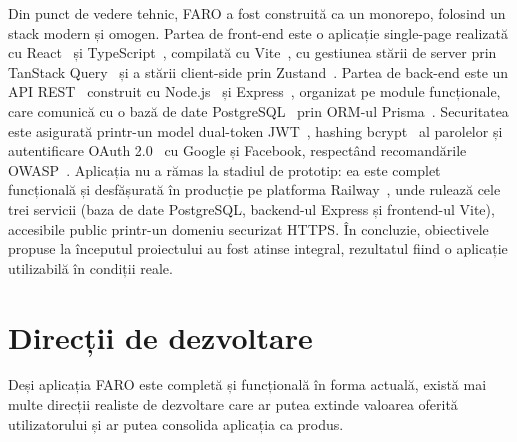 \documentclass[12pt,a4paper,oneside]{report}
\begin{document}
Din punct de vedere tehnic, FARO a fost construită ca un monorepo, folosind un stack modern și omogen. Partea de front-end este o aplicație single-page realizată cu React~\cite{ref:react} și TypeScript~\cite{ref:typescript}, compilată cu Vite~\cite{ref:vite}, cu gestiunea stării de server prin TanStack Query~\cite{ref:tanstack} și a stării client-side prin Zustand~\cite{ref:zustand}. Partea de back-end este un API REST~\cite{ref:rest} construit cu Node.js~\cite{ref:nodejs} și Express~\cite{ref:express}, organizat pe module funcționale, care comunică cu o bază de date PostgreSQL~\cite{ref:postgres} prin ORM-ul Prisma~\cite{ref:prisma}. Securitatea este asigurată printr-un model dual-token JWT~\cite{ref:jwt}, hashing bcrypt~\cite{ref:bcrypt} al parolelor și autentificare OAuth 2.0~\cite{ref:oauth2} cu Google și Facebook, respectând recomandările OWASP~\cite{ref:owasp}. Aplicația nu a rămas la stadiul de prototip: ea este complet funcțională și desfășurată în producție pe platforma Railway~\cite{ref:railway}, unde rulează cele trei servicii (baza de date PostgreSQL, backend-ul Express și frontend-ul Vite), accesibile public printr-un domeniu securizat HTTPS. În concluzie, obiectivele propuse la începutul proiectului au fost atinse integral, rezultatul fiind o aplicație utilizabilă în condiții reale.

\section{Direcții de dezvoltare}

Deși aplicația FARO este completă și funcțională în forma actuală, există mai multe direcții realiste de dezvoltare care ar putea extinde valoarea oferită utilizatorului și ar putea consolida aplicația ca produs.
\end{document}

